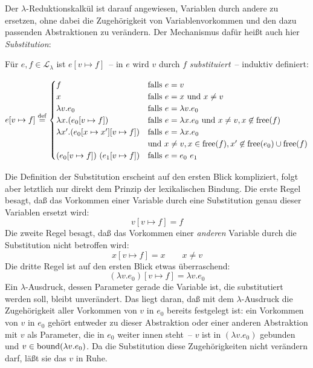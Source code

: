 Der $\lambda$-Reduktionskalkül ist darauf
angewiesen, Variablen durch andere zu ersetzen, ohne dabei die
Zugehörigkeit von Variablenvorkommen und den dazu passenden
Abstraktionen zu verändern.  Der Mechanismus dafür heißt auch hier
\textit{Substitution}:
%
\begin{definition}[Substitution]
  Für $e,f\in \mathcal{L}_{\lambda}$ ist $e[v\mapsto f]$~-- in $e$ wird $v$ durch $f$
  \textit{substituiert}~-- induktiv definiert:

  \begin{displaymath}
    e[v\mapsto f] \stackrel{\rm def}{=}
    \begin{cases}
      f & \text{falls } e = v\\
      x & \text{falls } e = x \text{ und } x \neq v\\
      \lambda v.e_0 & \text{falls } e = \lambda v.e_0\\
      \lambda x.(e_0[v\mapsto f]) & \text{falls } e = \lambda x.e_0 \text{
        und } x\neq v, x\not\in\operatorname{free}(f)\\
      \lambda x'.(e_0[x\mapsto x'][v\mapsto f]) & \text{falls }
      e = \lambda x.e_0 \\ & \text{und }
      x \neq v,x\in\operatorname{free}(f), x'\not\in\operatorname{free}(e_0)\cup\operatorname{free}(f)\\
      (e_0[v\mapsto f])~(e_1[v\mapsto f]) &
      \text{falls } e = e_0~e_1
    \end{cases}
  \end{displaymath}
  \end{definition}
%
Die Definition der Substitution erscheint auf den ersten Blick
kompliziert, folgt aber letztlich nur direkt dem Prinzip der
lexikalischen Bindung.  Die erste Regel besagt, daß das Vorkommen
einer Variable durch eine Substitution genau dieser Variablen ersetzt
wird:
%
\begin{displaymath}
      v[v\mapsto f] = f
\end{displaymath}
%
Die zweite Regel besagt, daß das Vorkommen einer \emph{anderen}
Variable durch die Substitution nicht betroffen wird:
%
\begin{displaymath}
    x[v\mapsto f] = x \qquad x\neq v
\end{displaymath}
%
Die dritte Regel ist auf den ersten Blick etwas überraschend:
%
\begin{displaymath}
    (\lambda v.e_0)[v\mapsto f] = \lambda v.e_0
\end{displaymath}
%
Ein $\lambda$-Ausdruck, dessen Parameter gerade die Variable ist, die
substitutiert werden soll, bleibt unverändert.  Das liegt daran, daß
mit dem $\lambda$-Ausdruck die Zugehörigkeit aller Vorkommen von $v$
in $e_0$ bereits festgelegt ist: ein Vorkommen von $v$ in $e_0$ gehört
entweder zu dieser Abstraktion oder einer anderen Abstraktion mit $v$
als Parameter, die in $e_0$ weiter innen steht~-- $v$ ist in $(\lambda
v.e_0)$ gebunden und $v\in\operatorname{bound}(\lambda v.e_0)$.
Da die Substitution diese Zugehörigkeiten nicht verändern darf, läßt
sie das $v$ in Ruhe.

